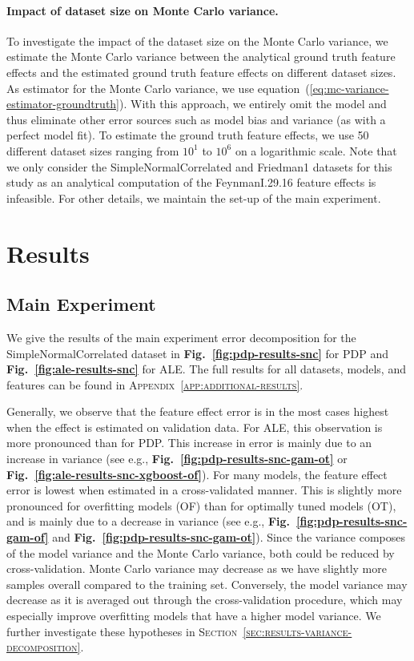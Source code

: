 \documentclass[runningheads]{llncs}
\begin{document}
\paragraph{Impact of dataset size on Monte Carlo variance.} To investigate the impact of the dataset size on the Monte Carlo variance, we
estimate the Monte Carlo variance between the analytical ground truth feature
effects and the estimated ground truth feature effects on different dataset
sizes. As estimator for the Monte Carlo variance, we use
equation~(\ref{eq:mc-variance-estimator-groundtruth}). With this approach, we
entirely omit the model and thus eliminate other error sources such as model
bias and variance (as with a perfect model fit). To estimate the ground truth
feature effects, we use 50 different dataset sizes ranging from $10^1$ to
$10^6$ on a logarithmic scale. Note that we only consider the
SimpleNormalCorrelated and Friedman1 datasets for this study as an analytical
computation of the FeynmanI.29.16 feature effects is infeasible. For other
details, we maintain the set-up of the main experiment.

\section{Results}\label{sec:results}

\subsection{Main Experiment}

We give the results of the main experiment error decomposition for the
SimpleNormalCorrelated dataset in \textbf{Fig.\@~\ref{fig:pdp-results-snc}} for
PDP and \textbf{Fig.\@~\ref{fig:ale-results-snc}} for ALE. The full results for  %
all datasets, models, and features can be found in
\textsc{Appendix~\ref{app:additional-results}}.

Generally, we observe that the feature effect error is in the most cases
highest when the effect is estimated on validation data. For ALE, this
observation is more pronounced than for PDP. This increase in error is mainly  %
due to an increase in variance (see e.g.,
\textbf{Fig.\@~\ref{fig:pdp-results-snc-gam-ot}} or
\textbf{Fig.\@~\ref{fig:ale-results-snc-xgboost-of}}). For many models, the
feature effect error is lowest when estimated in a cross-validated manner. This
is slightly more pronounced for overfitting models (OF) than for optimally
tuned models (OT), and is mainly due to a decrease in variance (see e.g.,
\textbf{Fig.\@~\ref{fig:pdp-results-snc-gam-of}} and
\textbf{Fig.\@~\ref{fig:pdp-results-snc-gam-ot}}). Since the variance composes
of the model variance and the Monte Carlo variance, both could be reduced by
cross-validation. Monte Carlo variance may decrease as we have slightly more
samples overall compared to the training set. Conversely, the model variance
may decrease as it is averaged out through the cross-validation procedure,
which may especially improve overfitting models that have a higher model
variance. We further investigate these hypotheses in
\textsc{Section~\ref{sec:results-variance-decomposition}}.
\end{document}
